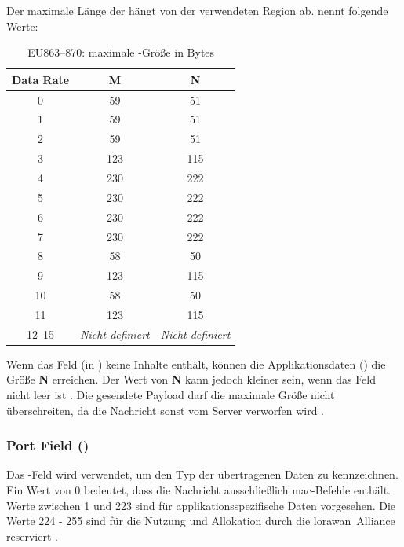 	Der maximale Länge der  hängt von der verwendeten Region ab.  
	 nennt folgende Werte:
	
	\begin{table}[H]
		\centering
		\begin{tabular}{|c|c|c|}
			\hline
			\textbf{Data Rate} & \textbf{M} & \textbf{N} \\ \hline
			0 & 59 & 51 \\ \hline
			1 & 59 & 51 \\ \hline
			2 & 59 & 51 \\ \hline
			3 & 123 & 115 \\ \hline
			4 & 230 & 222 \\ \hline
			5 & 230 & 222 \\ \hline
			6 & 230 & 222 \\ \hline
			7 & 230 & 222 \\ \hline
			8 & 58 & 50 \\ \hline
			9 & 123 & 115 \\ \hline
			10 & 58 & 50 \\ \hline
			11 & 123 & 115 \\ \hline
			12--15 & \textit{Nicht definiert} & \textit{Nicht definiert} \\ \hline
		\end{tabular}
		\caption{EU863–870: maximale -Grö{\ss}e in Bytes \cite{LoRaAlliance:2022}}
		\label{tab:lorawan-payload-m}
	\end{table}
	
	Wenn das Feld  (in ) keine Inhalte enthält, können die Applikationsdaten () die Grö{\ss}e \textbf{N} erreichen. Der Wert von \textbf{N} kann jedoch kleiner sein, wenn das Feld  nicht leer ist \cite[Kap. 2.4.6]{LoRaAlliance:2022}.  
	Die gesendete Payload darf die maximale Grö{\ss}e nicht überschreiten, da die Nachricht sonst vom Server verworfen wird \cite[15]{LoRaAlliance:2020b}.

	
	
\subsubsection{Port Field ()}
	Das -Feld wird verwendet, um den Typ der übertragenen Daten zu kennzeichnen. Ein Wert von 0 bedeutet, dass die Nachricht ausschlie{\ss}lich \ac{mac}-Befehle enthält. Werte zwischen 1 und 223 sind für applikationsspezifische Daten vorgesehen. Die Werte 224 - 255 sind für die Nutzung und Allokation durch die \ac{lorawan}~Alliance reserviert \cite[23]{LoRaAlliance:2020b}.

